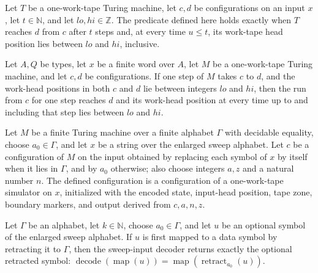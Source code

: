 \begin{definition}
\label{Turing.FinTM.DGSpan}
\leanok
{}
Let $T$ be a one-work-tape Turing machine, let $c,d$ be configurations on an input $x$,
let $t\in\mathbb{N}$, and let $lo,hi\in\mathbb{Z}$. The predicate defined here holds
exactly when $T$ reaches $d$ from $c$ after $t$ steps and, at every time $u\le t$, its
work-tape head position lies between $lo$ and $hi$, inclusive.
\end{definition}

\begin{lemma}
\label{Turing.FinTM.dgSpan_one}
\leanok
{}
Let $A,Q$ be types, let $x$ be a finite word over $A$, let $M$ be a one-work-tape Turing
machine, and let $c,d$ be configurations. If one step of $M$ takes $c$ to $d$, and the
work-head positions in both $c$ and $d$ lie between integers $lo$ and $hi$, then the run
from $c$ for one step reaches $d$ and its work-head position at every time up to and
including that step lies between $lo$ and $hi$.
\end{lemma}

\begin{definition}
\label{Turing.FinTM.dgStart}
\leanok
{}
Let $M$ be a finite Turing machine over a finite alphabet $\Gamma$ with decidable
equality, choose $a_0\in\Gamma$, and let $x$ be a string over the enlarged sweep
alphabet. Let $c$ be a configuration of $M$ on the input obtained by replacing each
symbol of $x$ by itself when it lies in $\Gamma$, and by $a_0$ otherwise; also choose
integers $a,z$ and a natural number $n$. The defined configuration is a configuration of
a one-work-tape simulator on $x$, initialized with the encoded state, input-head
position, tape zone, boundary markers, and output derived from $c,a,n,z$.
\end{definition}

\begin{lemma}
\label{Turing.FinTM.dg_native}
\leanok
{}
Let $\Gamma$ be an alphabet, let $k\in\mathbb N$, choose $a_0\in\Gamma$, and let $u$ be
an optional symbol of the enlarged sweep alphabet. If $u$ is first mapped to a data
symbol by retracting it to $\Gamma$, then the sweep-input decoder returns exactly the
optional retracted symbol:
$\operatorname{decode}(\operatorname{map}(u))=\operatorname{map}(\operatorname{retract}_{a_0}(u))$.
\end{lemma}

